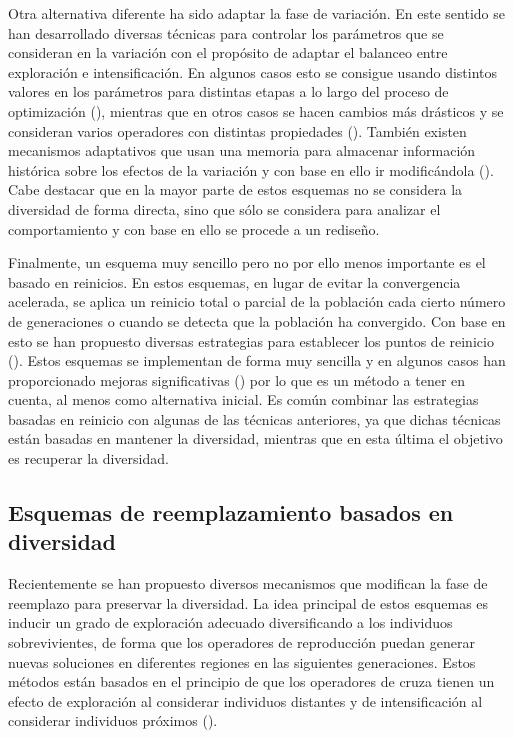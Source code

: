 Otra alternativa diferente ha sido adaptar la fase de variación.
%
En este sentido se han desarrollado diversas técnicas para controlar los parámetros que se consideran en la variación con el propósito de adaptar el balanceo entre exploración e intensificación.
%
En algunos casos esto se consigue usando distintos valores en los parámetros para distintas etapas a lo largo del proceso de optimización (\cite{yu2014differential}), mientras que en otros casos se hacen cambios más drásticos y se consideran varios operadores con distintas propiedades (\cite{lobo2007parameter}).
%
También existen mecanismos adaptativos que usan una memoria para almacenar información histórica sobre los efectos de la variación y con base en ello ir modificándola (\cite{yuen2009genetic}).
%
Cabe destacar que en la mayor parte de estos esquemas no se considera la diversidad de forma directa, sino que sólo se considera para analizar el comportamiento y con base en ello se procede a un rediseño.

Finalmente, un esquema muy sencillo pero no por ello menos importante es el basado en reinicios.
%
En estos esquemas, en lugar de evitar la convergencia acelerada, se aplica un reinicio total o parcial de la población cada cierto número de generaciones o cuando se detecta que la población ha convergido.
%
Con base en esto se han propuesto diversas estrategias para establecer los puntos de reinicio (\cite{jansen2002analysis}).
%
Estos esquemas se implementan de forma muy sencilla y en algunos casos han proporcionado mejoras significativas (\cite{koumousis2006saw}) por lo que es un método a tener en cuenta, al menos como alternativa inicial.
%
Es común combinar las estrategias basadas en reinicio con algunas de las técnicas anteriores, ya que dichas técnicas están basadas en mantener la diversidad, mientras que en esta última el objetivo es recuperar la diversidad.

\subsection{Esquemas de reemplazamiento basados en diversidad}

Recientemente se han propuesto diversos mecanismos que modifican la fase de reemplazo para preservar la diversidad.
%
La idea principal de estos esquemas es inducir un grado de exploración adecuado diversificando a los individuos sobrevivientes,
de forma que los operadores de reproducción puedan generar nuevas soluciones en diferentes regiones en las siguientes generaciones.
%
Estos métodos están basados en el principio de que los operadores de cruza tienen un efecto de exploración al 
considerar individuos distantes y de intensificación al considerar individuos próximos (\cite{eiben1998evolutionary}).

